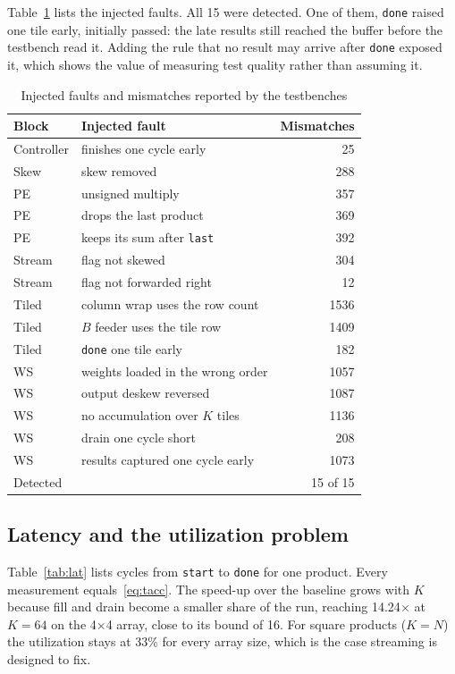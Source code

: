 \documentclass[conference]{IEEEtran}
\newcommand{\code}[1]{\texttt{#1}}
\begin{document}
Table~\ref{tab:mut} lists the injected faults. All 15 were detected. One of them, \code{done} raised one tile early, initially passed: the late results still reached the buffer before the testbench read it. Adding the rule that no result may arrive after \code{done} exposed it, which shows the value of measuring test quality rather than assuming it.

\begin{table}[t]
\centering
\caption{Injected faults and mismatches reported by the testbenches}
\label{tab:mut}
\setlength{\tabcolsep}{4pt}
\begin{tabular}{llr}
\toprule
Block & Injected fault & Mismatches \\
\midrule
Controller & finishes one cycle early & 25 \\
Skew & skew removed & 288 \\
PE & unsigned multiply & 357 \\
PE & drops the last product & 369 \\
PE & keeps its sum after \code{last} & 392 \\
Stream & flag not skewed & 304 \\
Stream & flag not forwarded right & 12 \\
Tiled & column wrap uses the row count & 1536 \\
Tiled & $B$ feeder uses the tile row & 1409 \\
Tiled & \code{done} one tile early & 182 \\
WS & weights loaded in the wrong order & 1057 \\
WS & output deskew reversed & 1087 \\
WS & no accumulation over $K$ tiles & 1136 \\
WS & drain one cycle short & 208 \\
WS & results captured one cycle early & 1073 \\
\midrule
\multicolumn{2}{l}{Detected} & 15 of 15 \\
\bottomrule
\end{tabular}
\end{table}

\subsection{Latency and the utilization problem}
Table~\ref{tab:lat} lists cycles from \code{start} to \code{done} for one product. Every measurement equals~\eqref{eq:tacc}. The speed-up over the baseline grows with $K$ because fill and drain become a smaller share of the run, reaching 14.24$\times$ at $K = 64$ on the 4$\times$4 array, close to its bound of 16. For square products ($K = N$) the utilization stays at 33\% for every array size, which is the case streaming is designed to fix.
\end{document}
